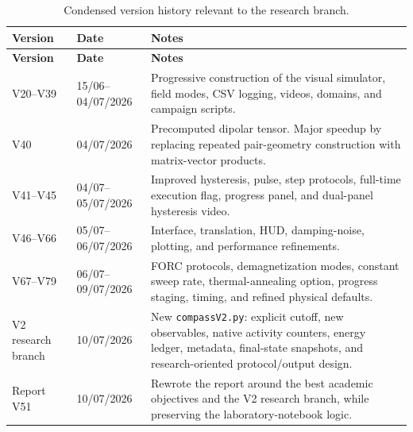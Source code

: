 \documentclass[11pt,a4paper]{article}
\newcommand{\code}[1]{\texttt{#1}}
\begin{document}
\begin{longtable}{@{}p{2.2cm}p{2.6cm}p{10.0cm}@{}}
\caption{Condensed version history relevant to the research branch.}\label{tab:versions}\\
\toprule
\textbf{Version} & \textbf{Date} & \textbf{Notes}\\
\midrule
\endfirsthead
\toprule
\textbf{Version} & \textbf{Date} & \textbf{Notes}\\
\midrule
\endhead
\bottomrule
\endfoot
V20--V39 & 15/06--04/07/2026 & Progressive construction of the visual simulator, field modes, CSV logging, videos, domains, and campaign scripts.\\
V40 & 04/07/2026 & Precomputed dipolar tensor. Major speedup by replacing repeated pair-geometry construction with matrix-vector products.\\
V41--V45 & 04/07--05/07/2026 & Improved hysteresis, pulse, step protocols, full-time execution flag, progress panel, and dual-panel hysteresis video.\\
V46--V66 & 05/07--06/07/2026 & Interface, translation, HUD, damping-noise, plotting, and performance refinements.\\
V67--V79 & 06/07--09/07/2026 & FORC protocols, demagnetization modes, constant sweep rate, thermal-annealing option, progress staging, timing, and refined physical defaults.\\
V2 research branch & 10/07/2026 & New \code{compassV2.py}: explicit cutoff, new observables, native activity counters, energy ledger, metadata, final-state snapshots, and research-oriented protocol/output design.\\
Report V51 & 10/07/2026 & Rewrote the report around the best academic objectives and the V2 research branch, while preserving the laboratory-notebook logic.\\
\end{longtable}
\end{document}
